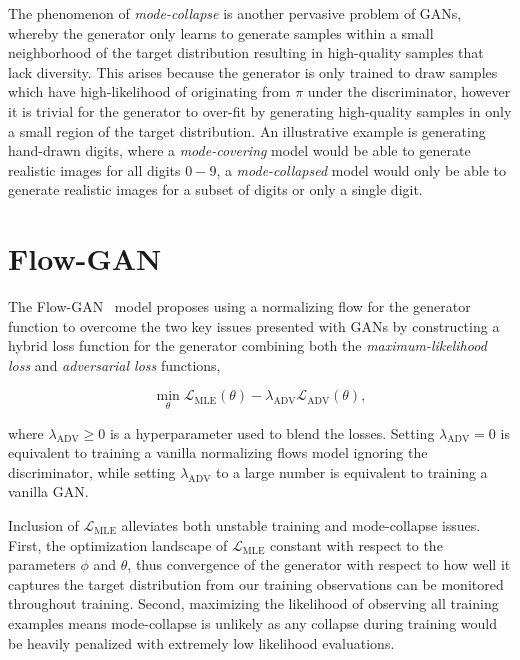 The phenomenon of \textit{mode-collapse} is another pervasive problem of GANs, whereby the generator only learns to
generate samples within a small neighborhood of the target distribution resulting in high-quality samples that lack
diversity.
This arises because the generator is only trained to draw samples which have high-likelihood of originating from $\pi$
under the discriminator, however it is trivial for the generator to over-fit by generating high-quality samples in only
a small region of the target distribution.
An illustrative example is generating hand-drawn digits, where a \textit{mode-covering} model would be able to generate
realistic images for all digits $0-9$, a \textit{mode-collapsed} model would only be able to generate realistic images
for a subset of digits or only a single digit.

\section{Flow-GAN}\label{sec:flow-gan}

The Flow-GAN~\cite{flow_gan} model proposes using a normalizing flow for the generator function to overcome the two
key issues presented with GANs by constructing a hybrid loss function for the generator combining both the
\textit{maximum-likelihood loss} and \textit{adversarial loss} functions,

\begin{equation*}
    \min_{\theta} \mathcal{L}_{\text{MLE}}(\theta) - \lambda_{\text{ADV}} \mathcal{L}_{\text{ADV}}(\theta),
    \label{eq:flowgan_loss}
\end{equation*}

where $\lambda_{\text{ADV}} \geq 0$ is a hyperparameter used to blend the losses.
Setting $\lambda_{\text{ADV}} = 0$ is equivalent to training a vanilla normalizing flows model ignoring the discriminator,
while setting $\lambda_{\text{ADV}}$ to a large number is equivalent to training a vanilla GAN\@.

Inclusion of $\mathcal{L}_{\text{MLE}}$ alleviates both unstable training and mode-collapse issues.
First, the optimization landscape of $\mathcal{L}_{\text{MLE}}$ constant with respect to the parameters $\phi$ and
$\theta$, thus convergence of the generator with respect to how well it captures the target distribution from our
training observations can be monitored throughout training.
Second, maximizing the likelihood of observing all training examples means mode-collapse is unlikely as any collapse
during training would be heavily penalized with extremely low likelihood evaluations.
